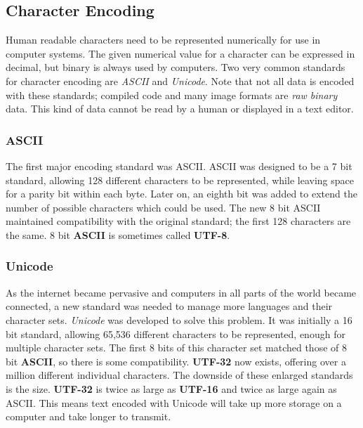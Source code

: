 \documentclass[9pt]{article}
\begin{document}
\subsection{Character Encoding}
\label{sec:orgefb7e2d}

Human readable characters need to be represented numerically for use in computer systems. The given numerical value for a character can be expressed in decimal, but binary is always used by computers. Two very common standards for character encoding are \emph{ASCII} and \emph{Unicode}. Note that not all data is encoded with these standards; compiled code and many image formats are \emph{raw binary} data. This kind of data cannot be read by a human or displayed in a text editor.

\subsubsection{ASCII}
\label{sec:org4f5679f}

The first major encoding standard was ASCII. ASCII was designed to be a 7 bit standard, allowing 128 different characters to be represented, while leaving space for a parity bit within each byte. Later on, an eighth bit was added to extend the number of possible characters which could be used. The new 8 bit ASCII maintained compatibility with the original standard; the first 128 characters are the same. 8 bit \textbf{ASCII} is sometimes called \textbf{UTF-8}.

\subsubsection{Unicode}
\label{sec:org85e5ae1}

As the internet became pervasive and computers in all parts of the world became connected, a new standard was needed to manage more languages and their character sets. \emph{Unicode} was developed to solve this problem. It was initially a 16 bit standard, allowing 65,536 different characters to be represented, enough for multiple character sets. The first 8 bits of this character set matched those of 8 bit \textbf{ASCII}, so there is some compatibility. \textbf{UTF-32} now exists, offering over a million different individual characters. The downside of these enlarged standards is the size. \textbf{UTF-32} is twice as large as \textbf{UTF-16} and twice as large again as ASCII. This means text encoded with Unicode will take up more storage on a computer and take longer to transmit.
\end{document}
